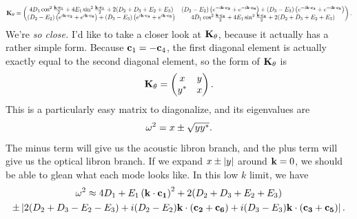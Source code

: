 \documentclass[12pt]{article}
\begin{document}
\[ \Scale[0.8]{\bv K_\th = \pmtrx{ 4D_1 \cos^2 \half{\Dot{k}{c_1}} + 4E_1 
\sin^2 \half{\Dot{k}{c_1}} + 2(D_2+D_3+E_2+E_3) & 
(D_2-E_2)\paren{e^{-i\Dot{k}{c_2}} + e^{-i\Dot{k}{c_6}} } + 
(D_3-E_3)\paren{e^{-i\Dot{k}{c_3}} + e^{-i\Dot{k}{c_5}} } \\ 
(D_2-E_2)\paren{e^{i\Dot{k}{c_2}} + 
e^{i\Dot{k}{c_6}} } + (D_3-E_3)\paren{e^{i\Dot{k}{c_3}} + e^{i\Dot{k}{c_5}} 
} & 4D_1 \cos^2 \half{\Dot{k}{c_4}} + 4E_1 \sin^2 
\half{\Dot{k}{c_4}} + 2(D_2+D_3+E_2+E_3)}.}\]
We're \emph{so close.} I'd like to take a closer look at $\mathbf{K}_\theta$, because 
it actually has a rather simple form. Because $\mathbf{c}_1 = -\mathbf{c}_4$, the first 
diagonal element is actually exactly equal to the second diagonal element, so 
the form of $\mathbf{K}_\theta$ is
\[ \mathbf{K}_\theta = \left(\begin{matrix} x & y \\ y^* & x\end{matrix}\right).\]
This is a particularly easy matrix to diagonalize, and its eigenvalues are
\[ \omega^2 = x \pm \sqrt{yy^*}.\]
The minus term will give us the acoustic libron branch, and the plus term will 
give us the optical libron branch. If we expand $x\pm \left | y \right |$ around $\mathbf{k} = 
0$, we should be able to glean what each mode looks like. In this low $k$ 
limit, we have
\begin{multline*} \omega^2 \approx 4D_1 + E_1 \left(\mathbf{k}\cdot\mathbf{c_1}\right)^2 + 
2(D_2+D_3+E_2+E_3) \\ \pm \left |  2(D_2+D_3-E_2-E_3) + 
i(D_2-E_2)\mathbf{k}\cdot\mathbf{(c_2+c_6)}+i(D_3-E_3)\mathbf{k}\cdot\mathbf{(c_3+c_5)} \right |. \end{multline*}

\end{document}
